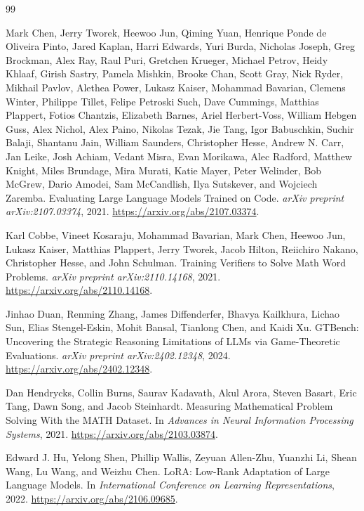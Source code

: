 \documentclass[11pt]{article}
\begin{document}
\begingroup
\footnotesize
\setlength{\itemsep}{0pt}
\setlength{\parsep}{0pt}
\begin{thebibliography}{99}

Mark Chen, Jerry Tworek, Heewoo Jun, Qiming Yuan, Henrique Ponde de Oliveira Pinto, Jared Kaplan, Harri Edwards, Yuri Burda, Nicholas Joseph, Greg Brockman, Alex Ray, Raul Puri, Gretchen Krueger, Michael Petrov, Heidy Khlaaf, Girish Sastry, Pamela Mishkin, Brooke Chan, Scott Gray, Nick Ryder, Mikhail Pavlov, Alethea Power, Lukasz Kaiser, Mohammad Bavarian, Clemens Winter, Philippe Tillet, Felipe Petroski Such, Dave Cummings, Matthias Plappert, Fotios Chantzis, Elizabeth Barnes, Ariel Herbert-Voss, William Hebgen Guss, Alex Nichol, Alex Paino, Nikolas Tezak, Jie Tang, Igor Babuschkin, Suchir Balaji, Shantanu Jain, William Saunders, Christopher Hesse, Andrew N. Carr, Jan Leike, Josh Achiam, Vedant Misra, Evan Morikawa, Alec Radford, Matthew Knight, Miles Brundage, Mira Murati, Katie Mayer, Peter Welinder, Bob McGrew, Dario Amodei, Sam McCandlish, Ilya Sutskever, and Wojciech Zaremba.
\newblock Evaluating Large Language Models Trained on Code.
\newblock \emph{arXiv preprint arXiv:2107.03374}, 2021.
\newblock \url{https://arxiv.org/abs/2107.03374}.

Karl Cobbe, Vineet Kosaraju, Mohammad Bavarian, Mark Chen, Heewoo Jun, Lukasz Kaiser, Matthias Plappert, Jerry Tworek, Jacob Hilton, Reiichiro Nakano, Christopher Hesse, and John Schulman.
\newblock Training Verifiers to Solve Math Word Problems.
\newblock \emph{arXiv preprint arXiv:2110.14168}, 2021.
\newblock \url{https://arxiv.org/abs/2110.14168}.

Jinhao Duan, Renming Zhang, James Diffenderfer, Bhavya Kailkhura, Lichao Sun, Elias Stengel-Eskin, Mohit Bansal, Tianlong Chen, and Kaidi Xu.
\newblock GTBench: Uncovering the Strategic Reasoning Limitations of LLMs via Game-Theoretic Evaluations.
\newblock \emph{arXiv preprint arXiv:2402.12348}, 2024.
\newblock \url{https://arxiv.org/abs/2402.12348}.

Dan Hendrycks, Collin Burns, Saurav Kadavath, Akul Arora, Steven Basart, Eric Tang, Dawn Song, and Jacob Steinhardt.
\newblock Measuring Mathematical Problem Solving With the MATH Dataset.
\newblock In \emph{Advances in Neural Information Processing Systems}, 2021.
\newblock \url{https://arxiv.org/abs/2103.03874}.

Edward J. Hu, Yelong Shen, Phillip Wallis, Zeyuan Allen-Zhu, Yuanzhi Li, Shean Wang, Lu Wang, and Weizhu Chen.
\newblock LoRA: Low-Rank Adaptation of Large Language Models.
\newblock In \emph{International Conference on Learning Representations}, 2022.
\newblock \url{https://arxiv.org/abs/2106.09685}.


\end{thebibliography}
\end{document}
